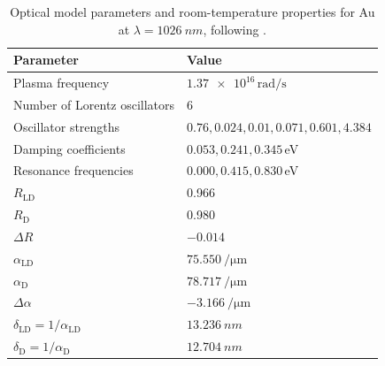\begin{table}[htbp]
    \centering
    \caption{Optical model parameters and room-temperature properties for Au at \(\lambda = \SI{1026}{nm}\), following \cite{Tsibidis_2018,Lin_2008,Chen_2010}.}
    \label{tab:ch3-au-optical}
    \begin{tabular}{@{}ll@{}}
        \toprule
        \rowcolor{gray!20}
        \textbf{Parameter}                                & \textbf{Value}                             \\
        \midrule
        Plasma frequency                                  & \(\num{1.37e16}\,\si{\radian\per\second}\) \\
        Number of Lorentz oscillators                     & 6                                          \\
        Oscillator strengths                              & \(0.76, 0.024, 0.01, 0.071, 0.601, 4.384\) \\
        Damping coefficients                              & \(0.053, 0.241, 0.345\)\,eV                \\
        Resonance frequencies                             & \(0.000, 0.415, 0.830\)\,eV                \\
        \(R_{\mathrm{LD}}\)                               & 0.966                                      \\
        \(R_{\mathrm{D}}\)                                & 0.980                                      \\
        \(\Delta R\)                                      & \(-0.014\)                                 \\
        \(\alpha_{\mathrm{LD}}\)                          & \(\SI{75.550}{\per\micro\metre}\)          \\
        \(\alpha_{\mathrm{D}}\)                           & \(\SI{78.717}{\per\micro\metre}\)          \\
        \(\Delta \alpha\)                                 & \(-\SI{3.166}{\per\micro\metre}\)          \\
        \(\delta_{\mathrm{LD}} = 1/\alpha_{\mathrm{LD}}\) & \(\SI{13.236}{nm}\)                        \\
        \(\delta_{\mathrm{D}} = 1/\alpha_{\mathrm{D}}\)   & \(\SI{12.704}{nm}\)                        \\
        \bottomrule
    \end{tabular}
\end{table}

